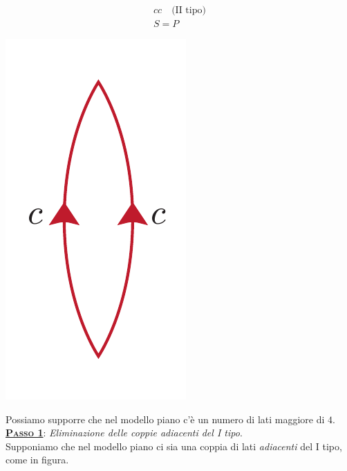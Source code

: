 \begin{demonstration}
\begin{center}
\begin{minipage}{.19\linewidth}
\begin{equation*}
\begin{array}{cc}
				cc\quad \text{(II tipo)}\\
				S=P
			\end{array}
		\end{equation*}
	\end{minipage}
	\begin{minipage}{.20\linewidth}
		\begin{center}
			\includegraphics[trim=0cm 0cm 0cm 0cm, clip, scale=0.35]{images/proj2lines.pdf}
		\end{center}
	\end{minipage}
\vspace{-3mm}
\end{center}
Possiamo supporre che nel modello piano c'è un numero di lati maggiore di $4$.\\
\textsc{\underline{\textbf{Passo 1}}}: \textit{Eliminazione delle coppie adiacenti del I tipo}.\\
Supponiamo che nel modello piano ci sia una coppia di lati \textit{adiacenti} del I tipo, come in figura.
\begin{center}

\end{center}
\end{demonstration}
